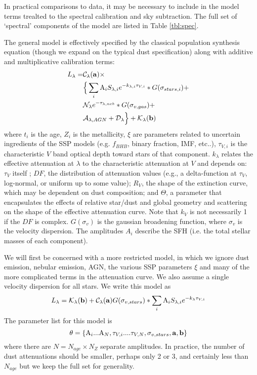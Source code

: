 \documentclass{emulateapj}
\begin{document}
In practical comparisons to data, it may be necessary to include in the model terms trealted to the spectral calibration and sky subtraction.  The full set of `spectral' components of the model are listed in Table \ref{tbl:spec}.




The general model is effectively specified by the classical population synthesis equation (though we expand on the typical dust specification) along with additive and multiplicative calibration terms:
\begin{equation}
\begin{split}
L_\lambda  = & \mathcal{C}_\lambda({\bf a}) \times\\
& \Big\{ \sum\limits_i \text{A}_i S_{\lambda,i} e^{-k_{\lambda, i}\tau_{V,i} } \ast G(\sigma_{stars, i}) +\\
& \mathcal{N}_\lambda e^{-\tau_{\lambda,neb}} \ast G(\sigma_{v,gas}) + \\ 
& \mathcal{A}_{\lambda, AGN} + \mathcal{D}_\lambda \Big\} + \mathcal{K}_\lambda({\bf b})
\end{split}
\end{equation}
where $t_i$ is the age, $Z_i$ is the metallicity, $\xi$ are parameters related to uncertain ingredients of the SSP models (e.g. $f_{BHB}$, binary fraction, IMF, etc..), $\tau_{V,i}$ is the characteristic $V$ band optical depth toward stars of that component. $k_\lambda$ relates the effective attenuation at $\lambda$ to the characteristic attenuation at $V$ and depends on: $\tau_V$ itself \citep[e.g.][]{chevallard}; $DF$,  the distribution of attenuation values (e.g., a delta-function at $\tau_V$, log-normal, or uniform up to some value); $R_V$, the shape of the extinction curve, which may be dependent on dust composition; and $\Theta$, a parameter that encapsulates the effects of relative star/dust and global geometry  and scattering on the shape of the effective attenuation curve.  Note that $k_V$ is not necessarily 1 if the $DF$ is complex. $G(\sigma_v)$ is the gaussian broadening function, where $\sigma_v$ is the velocity dispersion. The amplitudes $A_i$ describe the SFH (i.e. the total stellar masses of each component).

We will first be concerned with a more restricted model, in which we ignore dust emission, nebular emission, AGN, the various SSP parameters $\xi$ and many of the more complicated terms in the attenuation curve.  We also assume a single velocity dispersion for all stars. We write this model as 
\begin{equation}
L_\lambda =  \mathcal{K}_\lambda({\bf b}) + \mathcal{C}_\lambda({\bf a})  G(\sigma_{v, stars}) \ast \sum\limits_i \text{A}_i S_{\lambda,i} e^{-k_\lambda\tau_{V,i} } 
\end{equation}
The parameter list for this model is 
\begin{equation}
{\bf \theta} =  \{\text{A}_i...\text{A}_N, \tau_{V,i}....\tau_{V, N}, \sigma_{v, stars}, {\bf a}, {\bf b}\}
\end{equation}
where there are $N= N_{age} \times N_{Z}$ separate amplitudes.  In practice, the number of dust attenuations should be smaller, perhaps only 2 or 3, and certainly less than $N_{age}$ but we keep the full set for generality.
\end{document}
